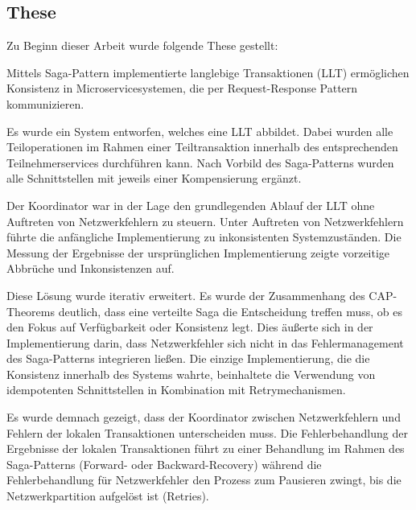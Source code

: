 \subsection{These}
Zu Beginn dieser Arbeit wurde folgende These gestellt:

\begin{thesis*} 
Mittels Saga-Pattern implementierte langlebige Transaktionen (LLT) ermöglichen Konsistenz in Microservicesystemen, die per Request-Response Pattern kommunizieren. 	
\end{thesis*}

Es wurde ein System entworfen, welches eine LLT abbildet. Dabei wurden alle Teiloperationen im Rahmen einer Teiltransaktion innerhalb des entsprechenden Teilnehmerservices durchführen kann. Nach Vorbild des Saga-Patterns wurden alle Schnittstellen mit jeweils einer Kompensierung ergänzt. 

Der Koordinator war in der Lage den grundlegenden Ablauf der LLT ohne Auftreten von Netzwerkfehlern zu steuern. Unter Auftreten von Netzwerkfehlern führte die anfängliche Implementierung zu inkonsistenten Systemzuständen. Die Messung der Ergebnisse der ursprünglichen Implementierung zeigte vorzeitige Abbrüche und Inkonsistenzen auf. 

Diese Lösung wurde iterativ erweitert. Es wurde der Zusammenhang des CAP-Theorems deutlich, dass eine verteilte Saga die Entscheidung treffen muss, ob es den Fokus auf Verfügbarkeit oder Konsistenz legt. Dies äußerte sich in der Implementierung darin, dass Netzwerkfehler sich nicht in das Fehlermanagement des Saga-Patterns integrieren ließen. Die einzige Implementierung, die die Konsistenz innerhalb des Systems wahrte, beinhaltete die Verwendung von idempotenten Schnittstellen in Kombination mit Retrymechanismen.

Es wurde demnach gezeigt, dass der Koordinator zwischen Netzwerkfehlern und Fehlern der lokalen Transaktionen unterscheiden muss. Die Fehlerbehandlung der Ergebnisse der lokalen Transaktionen führt zu einer Behandlung im Rahmen des Saga-Patterns (Forward- oder Backward-Recovery) während die Fehlerbehandlung für Netzwerkfehler den Prozess zum Pausieren zwingt, bis die Netzwerkpartition aufgelöst ist (Retries). 

